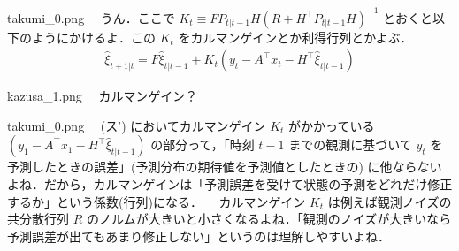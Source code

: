 \documentclass[b5paper,xelatex,ja=standard,10pt]{bxjsarticle}
\begin{document}
\begin{SERIFU}[colback=PaleGold]{takumi_0.png}
　うん．ここで $K_t \equiv FP_{t|t-1} H (R + H^\top P_{t|t-1} H)^{-1}$ とおくと以下のようにかけるよ．この $K_t$ をカルマンゲインとか利得行列とかよぶ．
\begin{align}
\hat{\xi}_{t+1|t} = F\hat{\xi}_{t|t-1} + K_t (y_t - A^\top x_t - H^\top \hat{\xi}_{t|t-1}) \tag{ス'}
\end{align}
\end{SERIFU}


\begin{SERIFU}[colback=PaleIris]{kazusa_1.png}
　カルマンゲイン？
\end{SERIFU}


\begin{SERIFU}[colback=PaleGold]{takumi_0.png}
　(ス') においてカルマンゲイン $K_t$ がかかっている $(y_1 - A^\top x_1 - H^\top \hat{\xi}_{t|t-1})$ の部分って，「時刻 $t-1$ までの観測に基づいて $y_t$ を予測したときの誤差」(予測分布の期待値を予測値としたときの) に他ならないよね．だから，カルマンゲインは「予測誤差を受けて状態の予測をどれだけ修正するか」という係数(行列)になる．
　カルマンゲイン $K_t$ は例えば観測ノイズの共分散行列 $R$ のノルムが大きいと小さくなるよね．「観測のノイズが大きいなら予測誤差が出てもあまり修正しない」というのは理解しやすいよね．
\end{SERIFU}

\end{document}
